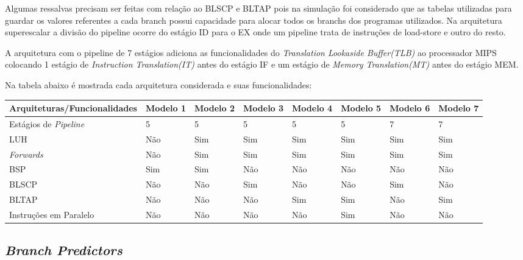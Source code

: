 \documentclass[pdftex,12pt,a4paper]{article}
\begin{document}
Algumas ressalvas precisam ser feitas com relação ao BLSCP e BLTAP pois na simulação foi considerado 
que as tabelas utilizadas para guardar os valores referentes a cada branch possui capacidade para 
alocar todos os branchs dos programas utilizados. Na arquitetura superescalar a divisão do pipeline 
ocorre do estágio ID para o EX onde um pipeline trata de instruções de load-store e outro do resto.

A arquitetura com o pipeline de 7 estágios adiciona as funcionalidades do \textit{Translation 
Lookaside Buffer(TLB)} ao processador MIPS colocando 1 estágio de \textit{Instruction 
Translation(IT)} antes do estágio IF e um estágio de \textit{Memory Translation(MT)} antes do 
estágio MEM.

Na tabela abaixo é mostrada cada arquitetura considerada e suas funcionalidades:

\begin{table}[h]
\resizebox{15cm}{!} {
\begin{tabular}{l|lllllll}
Arquiteturas/Funcionalidades  & Modelo 1 & Modelo 2 & Modelo 3 & Modelo 4 & Modelo 5 & Modelo 6 & Modelo 7 \\ \hline
Estágios de \textit{Pipeline} & 5        & 5        & 5        & 5        & 5        & 7        & 7        \\
LUH                           & Não      & Sim      & Sim      & Sim      & Sim      & Sim      & Sim      \\
\textit{Forwards}             & Não      & Sim      & Sim      & Sim      & Sim      & Sim      & Sim      \\
BSP                           & Sim      & Sim      & Não      & Não      & Não      & Não      & Não      \\
BLSCP                         & Não      & Não      & Sim      & Não      & Não      & Sim      & Não      \\
BLTAP                         & Não      & Não      & Não      & Sim      & Sim      & Não      & Sim      \\
Instruções em Paralelo        & Não      & Não      & Não      & Não      & Sim      & Não      & Não      \\ \hline
\end{tabular}
}
\end{table}

\subsection{\textit{Branch Predictors}}
\end{document}
